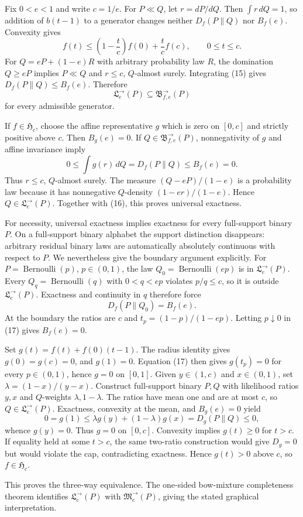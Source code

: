 Fix \(0<e<1\) and write \(c=1/e\).  For \(P\ll Q\), let \(r=dP/dQ\).  Then \(\int r\,dQ=1\), so addition of \(b(t-1)\) to a generator changes neither \(D_f(P\|Q)\) nor \(B_f(e)\).  Convexity gives
\[
 f(t)\le\left(1-\frac tc\right)f(0)+\frac tc f(c),\qquad 0\le t\le c. \tag{15}
\]
For \(Q=eP+(1-e)R\) with arbitrary probability law \(R\), the domination \(Q\ge eP\) implies \(P\ll Q\) and \(r\le c\), \(Q\)-almost surely.  Integrating (15) gives \(D_f(P\|Q)\le B_f(e)\).  Therefore
\[
 \mathfrak L^{\to}_e(P)\subseteq\mathfrak B^{\to}_{f,e}(P) \tag{16}
\]
for every admissible generator.

If \(f\in\mathfrak H_c\), choose the affine representative \(g\) which is zero on \([0,c]\) and strictly positive above \(c\).  Then \(B_g(e)=0\).  If \(Q\in\mathfrak B^{\to}_{f,e}(P)\), nonnegativity of \(g\) and affine invariance imply
\[
 0\le\int g(r)\,dQ=D_f(P\|Q)\le B_f(e)=0.
\]
Thus \(r\le c\), \(Q\)-almost surely.  The measure \((Q-eP)/(1-e)\) is a probability law because it has nonnegative \(Q\)-density \((1-er)/(1-e)\).  Hence \(Q\in\mathfrak L^{\to}_e(P)\).  Together with (16), this proves universal exactness.

For necessity, universal exactness implies exactness for every full-support binary \(P\).  On a full-support binary alphabet the support distinction disappears: arbitrary residual binary laws are automatically absolutely continuous with respect to \(P\).  We nevertheless give the boundary argument explicitly.  For \(P=\operatorname{Bernoulli}(p)\), \(p\in(0,1)\), the law \(Q_0=\operatorname{Bernoulli}(ep)\) is in \(\mathfrak L^{\to}_e(P)\).  Every \(Q_q=\operatorname{Bernoulli}(q)\) with \(0<q<ep\) violates \(p/q\le c\), so it is outside \(\mathfrak L^{\to}_e(P)\).  Exactness and continuity in \(q\) therefore force
\[
 D_f(P\|Q_0)=B_f(e). \tag{17}
\]
At the boundary the ratios are \(c\) and \(t_p=(1-p)/(1-ep)\).  Letting \(p\downarrow0\) in (17) gives \(B_f(e)=0\).

Set \(g(t)=f(t)+f(0)(t-1)\).  The radius identity gives \(g(0)=g(c)=0\), and \(g(1)=0\).  Equation (17) then gives \(g(t_p)=0\) for every \(p\in(0,1)\), hence \(g=0\) on \([0,1]\).  Given \(y\in(1,c)\) and \(x\in(0,1)\), set \(\lambda=(1-x)/(y-x)\).  Construct full-support binary \(P,Q\) with likelihood ratios \(y,x\) and \(Q\)-weights \(\lambda,1-\lambda\).  The ratios have mean one and are at most \(c\), so \(Q\in\mathfrak L^{\to}_e(P)\).  Exactness, convexity at the mean, and \(B_g(e)=0\) yield
\[
 0=g(1)\le \lambda g(y)+(1-\lambda)g(x)=D_g(P\|Q)\le0,
\]
whence \(g(y)=0\).  Thus \(g=0\) on \([0,c]\).  Convexity implies \(g(t)\ge0\) for \(t>c\).  If equality held at some \(t>c\), the same two-ratio construction would give \(D_g=0\) but would violate the cap, contradicting exactness.  Hence \(g(t)>0\) above \(c\), so \(f\in\mathfrak H_c\).

This proves the three-way equivalence.  The one-sided bow-mixture completeness theorem identifies \(\mathfrak L^{\to}_e(P)\) with \(\mathfrak M^{\to}_e(P)\), giving the stated graphical interpretation.